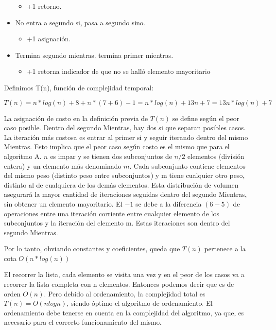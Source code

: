 \documentclass{article}
\begin{document}
\begin{itemize}
\begin{itemize}
        \item +1 retorno.
    \end{itemize}
    \item No entra a segundo si, pasa a segundo sino.
    \begin{itemize}
        \item +1 asignación.
    \end{itemize}
    \item Termina segundo mientras. termina primer mientras.
    \begin{itemize}
        \item +1 retorna indicador de que no se halló elemento mayoritario
    \end{itemize}

\end{itemize}

Definimos T(n), función de complejidad temporal:

\begin{equation}
    T(n) = n*log(n) + 8 + n*( 7 + 6 ) - 1 = n*log(n) + 13n + 7 = 13n*log(n) + 7
\end{equation}


La asignación de costo en la definición previa de \(T(n)\) se define según el peor caso posible. Dentro del segundo Mientras, hay dos si que separan posibles casos. La iteración más costosa es entrar al primer si y seguir iterando dentro del mismo Mientras. Esto implica que el peor caso según costo es el mismo que para el algoritmo A. \(n\) es impar y se tienen dos subconjuntos de \(n/2\) elementos (división entera) y un elemento más denominado \(m\). 
Cada subconjunto contiene elementos del mismo peso (distinto peso entre subconjuntos) y m tiene cualquier otro peso, distinto al de cualquiera de los demás elementos. Esta distribución de volumen asegurará la mayor cantidad de iteraciones seguidas dentro del segundo Mientras, sin obtener un elemento mayoritario.
El \(-1\) se debe a la diferencia \((6 - 5)\) de operaciones entre una iteración corriente entre cualquier elemento de los subconjuntos y la iteración del elemento m. Estas iteraciones son dentro del segundo Mientras.

Por lo tanto, obviando constantes y coeficientes, queda que \(T(n)\) pertenece a la cota \(O(n*log(n))\)

El recorrer la lista, cada elemento se visita una vez y en el peor de los casos va a recorrer la lista completa con n elementos. Entonces podemos decir que es de orden \(O(n)\). 
Pero debido al ordenamiento, la complejidad total es \(T(n) = O(n log n)\), siendo óptimo el algoritmo de ordenamiento. El ordenamiento debe tenerse en cuenta en la complejidad del algoritmo, ya que, es necesario para el correcto funcionamiento del mismo.
\end{document}
